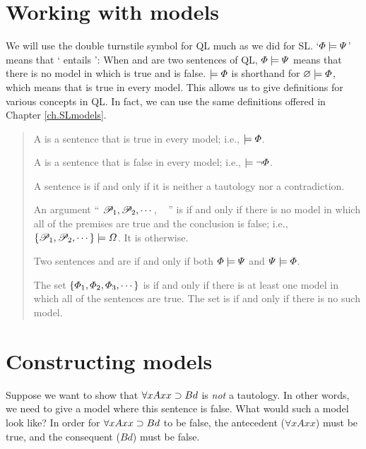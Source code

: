 \section{Working with models}
\label{sec.UsingModels}


We will use the double turnstile symbol for QL much as we did for SL. `$\varPhi{}\models\varPsi{}$' means that `\metaA{} entails \metaB{}': When \metaA{} and \metaB{} are two sentences of QL, $\varPhi{}\models\varPsi{}$ means that there is no model in which \metaA{} is true and \metaB{} is false. $\models\varPhi{}$ is shorthand for $\varnothing\models\varPhi{}$, which means that \metaA{} is true in every model. This allows us to give definitions for various concepts in QL. In fact, we can use the same definitions offered in Chapter \ref{ch.SLmodels}.

\begin{quote}
A  is a sentence \metaA{} that is true in every model; i.e.,  $\models\varPhi{}$.

A  is a sentence \metaA{} that is false in every model; i.e., $\models\neg\varPhi{}$.

A sentence is  if and only if it is neither a tautology nor a contradiction.

An argument `` $\mathscr{P}_1, \mathscr{P}_2, \cdots$, \therefore\ \metaC{} '' is  if and only if there is no model in which all of the premises are true and the conclusion is false; i.e., $\{\mathscr{P}_1,\mathscr{P}_2,\cdots\}\models\varOmega{}$. It is  otherwise.

Two sentences \metaA{} and \metaB{} are  if and only if both $\varPhi{}\models\varPsi{}$ and $\varPsi{}\models\varPhi{}$.

The set $\{\varPhi{}_1,\varPhi{}_2,\varPhi{}_3,\cdots\}$ is  if and only if there is at least one model in which all of the sentences are true. The set is  if and only if there is no such model.

\end{quote}


\section{Constructing models}

Suppose we want to show that $\forall xAxx \supset Bd$ is \emph{not} a tautology. In other words, we need to give a model where this sentence is false. What would such a model look like? In order for $\forall xAxx \supset Bd$ to be false, the antecedent ($\forall x Axx$) must be true, and the consequent ($Bd$) must be false.

